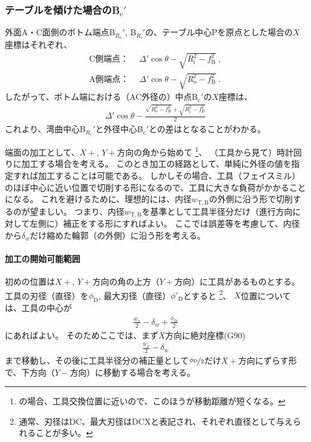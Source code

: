 \subsubsection{テーブルを傾けた場合のB\texorpdfstring{$_\mathrm c'$}{c'}}
外面A・C面側のボトム端点B$_{R_\mathrm o}'$, B$_{R_\mathrm i}'$の、テーブル中心Pを原点とした場合の$X$座標はそれぞれ、
\begin{align*}
  \text{C側端点：}&~~
  \varDelta'\cos\theta-\sqrt{R_\mathrm i^2-f_\mathrm B^2}\ ,\\
  \text{A側端点：}&~~
  \varDelta'\cos\theta-\sqrt{R_\mathrm o^2-f_\mathrm B^2}\ .
\end{align*}
したがって、ボトム端における（AC外径の）中点B$_\mathrm c'$の$X$座標は、
\begin{align}
  \label{eq:tableBc}
  \varDelta'\cos\theta-\frac{\sqrt{R_\mathrm o^2-f_\mathrm B^2}+\sqrt{R_\mathrm i^2-f_\mathrm B^2}}2
\end{align}
これより、湾曲中心B$_{R_\mathrm c}'$と外径中心B$_\mathrm c'$との差はとなることがわかる。




\clearpage
端面の加工として、$X+$, $Y+$方向の角から始めて
\footnote{\DMname の場合、工具交換位置に近いので、このほうが移動距離が短くなる。}、
（工具から見て）時計回りに加工する場合を考える。
このとき加工の経路として、単純に外径の値を指定すれば加工することは可能である。
しかしその場合、工具（フェイスミル）のほぼ中心に近い位置で切削する形になるので、工具に大きな負荷がかかることになる。
これを避けるために、理想的には、内径$w_{\mathrm T, \mathrm B}$の外側に沿う形で切削するのが望ましい。
つまり、内径$w_{\mathrm T, \mathrm B}$を基準として工具半径分だけ（進行方向に対して左側に）補正をする形にすればよい。
ここでは誤差等を考慮して、内径から$\delta_w$だけ縮めた輪郭（の外側）に沿う形を考える。



\paragraph{加工の開始可能範囲}\noindent
初めの位置は$X+$, $Y+$方向の角の上方（$Y+$方向）に工具があるものとする。
工具の刃径（直径）を$\phi_\mathrm D$, 最大刃径（直径）$\phi'_\mathrm D$とすると
\footnote{通常、刃径はDC、最大刃径はDCXと表記され、それぞれ直径として与えられることが多い。}、
$X$位置については、工具の中心が
\begin{align}
  \label{eq:tanmenKakouStartX}
  \frac{w_x}2-\delta_w+\frac{\phi_\mathrm D}2
\end{align}
にあればよい。
そのためここでは、まず$X$方向に絶対座標(G90)
\begin{align*}
  \frac{w_x}2-\delta_w
\end{align*}
まで移動し、その後に工具半径分の補正量として$\nicefrac{\phi_\mathrm D}2$だけ$X+$方向にずらす形で、下方向（$Y-$方向）に移動する場合を考える。



